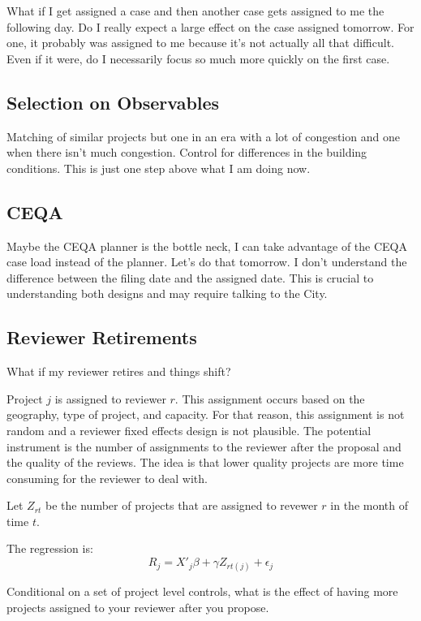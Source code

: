 \documentclass[12pt]{article}
\theoremstyle{definition}
\begin{document}
What if I get assigned a case and then another case gets assigned to me the following day. Do I really expect a large effect on the case assigned tomorrow. For one, it probably was assigned to me because it's not actually all that difficult. Even if it were, do I necessarily focus so much more quickly on the first case. 


\subsection{Selection on Observables}
Matching of similar projects but one in an era with a lot of congestion and one when there isn't much congestion. Control for differences in the building conditions. This is just one step above what I am doing now. 

\subsection{CEQA}
Maybe the CEQA planner is the bottle neck, I can take advantage of the CEQA case load instead of the planner. Let's do that tomorrow. I don't understand the difference between the filing date and the assigned date. This is crucial to understanding both designs and may require talking to the City. 

\subsection{Reviewer Retirements}
What if my reviewer retires and things shift?


Project $j$ is assigned to reviewer $r$. This assignment occurs based on the geography, type of project, and capacity. For that reason, this assignment is not random and a reviewer fixed effects design is not plausible. The potential instrument is the number of assignments to the reviewer after the proposal and the quality of the reviews. The idea is that lower quality projects are more time consuming for the reviewer to deal with. 

Let $Z_{rt}$ be the number of projects that are assigned to revewer $r$ in the month of time $t$. 

The regression is:
$$R_{j} = X'_j\beta + \gamma Z_{rt(j)} + \epsilon_j$$

Conditional on a set of project level controls, what is the effect of having more projects assigned to your reviewer after you propose. 
\end{document}
